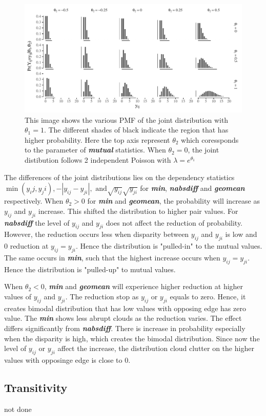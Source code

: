 \documentclass[12pt,a4paper,twoside,openany]{book}
\makeatletter
\def\maxwidth{ %
  \ifdim\Gin@nat@width>\linewidth
    \linewidth
  \else
    \Gin@nat@width
  \fi
}
\newenvironment{knitrout}{}{} %
\newcommand{\BI}[1]{\textit{\textbf{#1}}}
\makeatother
\begin{document}
\begin{figure}[H]
\begin{knitrout}
\color{fgcolor}

{\centering \includegraphics[width=\maxwidth]{figure/unnamed-chunk-3-1} 

}



\end{knitrout}
\caption [Joint distribution with mutual statistics]{This image shows the various PMF of the joint distribution with $\theta_1 =1 $. The different shades of black indicate the region that has higher probability. Here the top axis represent $\theta_2$ which coressponds to the parameter of \textit{\textbf{mutual}} statistics. When $\theta_2 = 0$, the joint distibution follows 2 independent Poisson with $\lambda = e^{\theta_1}$}
\end{figure}

The differences of the joint distributions lies on the dependency statistics $\min(y_ij,y_ji),-|y_{ij}-y_{ji}|, \text{ and} \sqrt{y_{ij}}\sqrt{y_{ji}}$ for 
 \BI{min}, \BI{nabsdiff} and \BI{geomean} respectively.
When $\theta_2>0$ for \BI{min} and \BI{geomean}, the probability will increase as $y_{ij}$ and $y_{ji}$ increase. 
This shifted the distribution to higher pair values. 
For \BI{nabsdiff} the level of $y_{ij}$ and $y_{ji}$ does not affect the reduction of probability. 
However, the reduction occurs less when disparity between $y_{ij}$ and $y_{ji}$ is low and 0 reduction at $y_{ij}=y_{ji}$. 
Hence the distribution is "pulled-in" to the mutual values. 
The same occurs in \BI{min}, such that the highest increase occurs when $y_{ij}=y_{ji}$. 
Hence the distribution is "pulled-up" to mutual values.

When $\theta_2 <0$, \BI{min} and \BI{geomean} will experience higher reduction at higher values of $y_{ij}$ and $y_{ji}$. The reduction stop as $y_{ij}$ or $y_{ji}$ equals to zero. 
Hence, it creates bimodal distribution that has low values with opposing edge has zero value. 
The \BI{min} shows less abrupt clouds as the reduction varies. 
The effect differs significantly from \BI{nabsdiff}. 
There is increase in probability especially when the disparity is high, which creates the bimodal distribution. 
Since now the level of $y_{ij}$ or $y_{ji}$ affect the increase, the distribution cloud clutter on the higher values with opposinge edge is close to 0.

\subsection{Transitivity}
not done
{}

\end{document}
